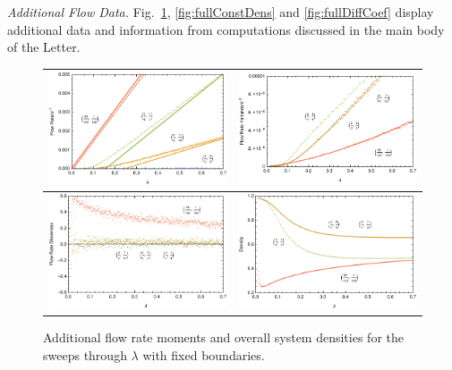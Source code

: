 \documentclass[
reprint,
 amsmath,amssymb,
 aps,
 prl,
]{revtex4-1}
\begin{document}
\textit{Additional Flow Data.} Fig.~\ref{fig:fullLambdaScans}, \ref{fig:fullConstDens} and \ref{fig:fullDiffCoef} display additional data and information from computations discussed in the main body of the Letter.
\begin{figure}[h!]
\vspace{1em}
\caption{\label{fig:fullLambdaScans} Additional flow rate moments and overall system densities for the sweeps through $\lambda$ with fixed boundaries.}
\begin{center}
 \begin{tabular}{c|c}
    \includegraphics[width=0.5\linewidth]{../tex-src/images/lambdaScan/newFlowMean} & \includegraphics[width=0.5\linewidth]{../tex-src/images/lambdaScan/newFlowVar} \\
    \hline
    \includegraphics[width=0.5\linewidth]{../tex-src/images/lambdaScan/newFlowSkew} & \includegraphics[width=0.5\linewidth]{../tex-src/images/lambdaScan/newDens} \\
    \end{tabular}
\end{center}
    \vspace{-0em}
\end{figure}
\end{document}
